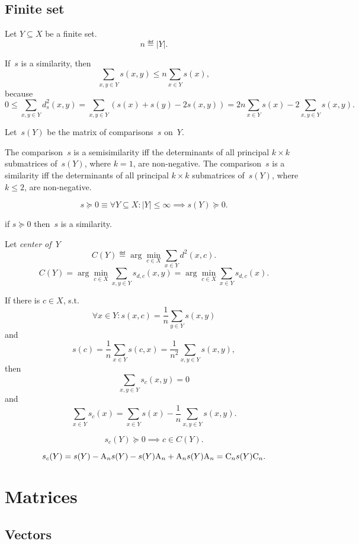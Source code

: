 \documentclass[10pt,a4paper]{article}
\theoremstyle{plain} \newtheorem{Lem}{Lemma}
\begin{document}
\subsection{Finite set}


Let $Y \subseteq X$ be a finite set.
$$ n \eqdef |Y|. $$

If~$s$ is a similarity, then
$$ \sum_{x,y \in Y} s(x,y) \le n \sum_{x \in Y} s(x), $$
because
$$ 0 \le \sum_{x,y \in Y} d_s^2(x,y) = \sum_{x,y \in Y} (s(x) + s(y) - 2 s(x,y)) = 2 n \sum_{x \in Y} s(x) - 2 \sum_{x,y \in Y} s(x,y). $$

Let~$s(Y)$ be the matrix of comparisons~$s$ on~$Y$.

The comparison~$s$ is a semisimilarity iff the determinants of all principal $k \times k$ submatrices of~$s(Y)$, where $k = 1$, are non-negative.
The comparison~$s$ is a similarity     iff the determinants of all principal $k \times k$ submatrices of~$s(Y)$, where $k \le 2$, are non-negative.

$$ s \succeq 0 \equiv \forall Y \subseteq X : |Y| \le \infty \implies s(Y) \succeq 0. $$

if $s \succeq 0$ then~$s$ is a similarity.

Let {\em center of~$Y$}
$$ C(Y) \eqdef \arg \min_{c \in X} \sum_{x \in Y} d^2(x,c). $$
$$ C(Y) = \arg \min_{c \in X} \sum_{x,y \in Y}s_{d,c} (x,y) = \arg \min_{c \in X} \sum_{x \in Y}s_{d,c} (x). $$

If there is $c \in X$, s.t.
$$ \forall x \in Y : s(x,c) = \frac 1 n \sum_{y \in Y} s(x,y) $$
and
$$ s(c) = \frac 1 n \sum_{x \in Y} s(c,x) = \frac 1 {n^2} \sum_{x,y \in Y} s(x,y), $$
then
$$ \sum_{x,y \in Y} s_c(x,y) = 0 $$
and
$$ \sum_{x \in Y} s_c(x) = \sum_{x \in Y} s(x) - \frac 1 n \sum_{x,y \in Y} s(x,y). $$

$$ s_c(Y) \succeq 0 \implies c \in C(Y). $$

$$ s_c(Y) = s(Y) - \mathrm A_n s(Y) - s(Y) \mathrm A_n + \mathrm A_n s(Y) \mathrm A_n = \mathrm C_n s(Y) \mathrm C_n. $$




\section{Matrices}

\subsection{Vectors}
\end{document}
